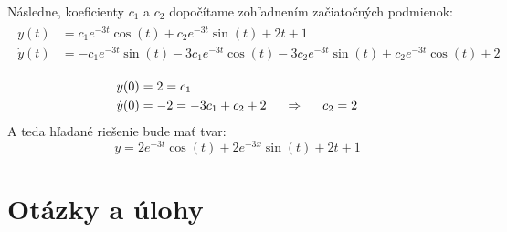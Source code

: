 \documentclass[a4paper, 10pt, ]{article}
\begin{document}
Následne, koeficienty $c_1$ a $c_2$ dopočítame zohľadnením začiatočných podmienok:
\begin{align}
    \begin{split}
        y(t) &= c_1 e^{-3t}\cos{(t)} + c_2 e^{-3t}\sin{(t)} + 2t + 1 \\
        \Dot{y}(t) &= -c_{1}e^{-3t}\sin{(t)} - 3c_{1}e^{-3t}\cos{(t)} - 3c_{2}e^{-3t}\sin{(t)} + c_{2}e^{-3t}\cos{(t)} + 2 \\
    \end{split}
\end{align}
\begin{align}
    \begin{split}
        y(0) &= 2 = c_{1} \\
        \Dot{y}(0) &= -2 = -3c_{1} + c_{2} + 2 \hspace{0.5cm} \Rightarrow \hspace{0.5cm} c_{2} = 2
    \end{split}
\end{align}
A teda hľadané riešenie bude mať tvar:
\begin{equation}
    y = 2 e^{-3t}\cos{(t)} + 2 e^{-3x}\sin{(t)} + 2t + 1
\end{equation}



























\section{Otázky a úlohy}
\end{document}

